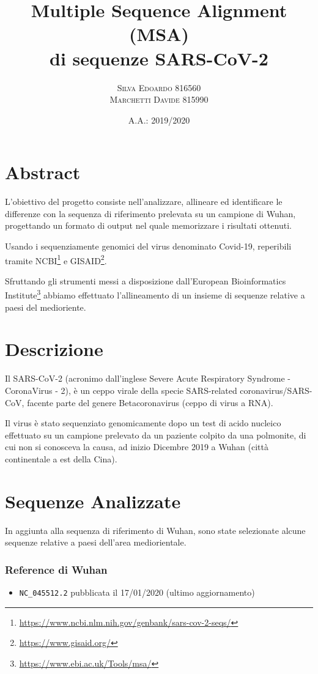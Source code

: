 \documentclass[11pt,italian]{article}
\title{Multiple Sequence Alignment (MSA) \\ di sequenze SARS-CoV-2}
\date{A.A.: 2019/2020}
\author{
    \textsc{Silva Edoardo} 816560 \\
    \textsc{Marchetti Davide} 815990
}
\begin{document}
\maketitle

\section*{Abstract}
L'obiettivo del progetto consiste nell'analizzare, allineare ed identificare le differenze con la sequenza di riferimento prelevata su un campione di Wuhan, progettando un formato di output nel quale memorizzare i risultati ottenuti.

Usando i sequenziamente genomici del virus denominato Covid-19, reperibili tramite NCBI\footnote{\url{https://www.ncbi.nlm.nih.gov/genbank/sars-cov-2-seqs/}} e GISAID\footnote{\url{https://www.gisaid.org/}}.

Sfruttando gli strumenti messi a disposizione dall'European Bioinformatics Institute\footnote{\url{https://www.ebi.ac.uk/Tools/msa/}} abbiamo effettuato l'allineamento di un insieme di sequenze relative a paesi del medioriente.

\newpage
\section{Descrizione}
Il SARS-CoV-2 (acronimo dall'inglese Severe Acute Respiratory Syndrome - CoronaVirus - 2), è un ceppo virale della specie SARS-related coronavirus/SARS-CoV, facente parte del genere Betacoronavirus (ceppo di virus a RNA).

Il virus è stato sequenziato genomicamente dopo un test di acido nucleico effettuato su un campione prelevato da un paziente colpito da una polmonite, di cui non si conosceva la causa, ad inizio Dicembre 2019 a Wuhan (città continentale a est della Cina).

\newpage
\section{Sequenze Analizzate}
In aggiunta alla sequenza di riferimento di Wuhan, sono state selezionate alcune sequenze relative a paesi dell'area mediorientale.

\subsubsection*{Reference di Wuhan}
\begin{itemize}
    \item \lstinline{NC_045512.2} pubblicata il 17/01/2020 (ultimo aggiornamento)
\end{itemize}
\end{document}
